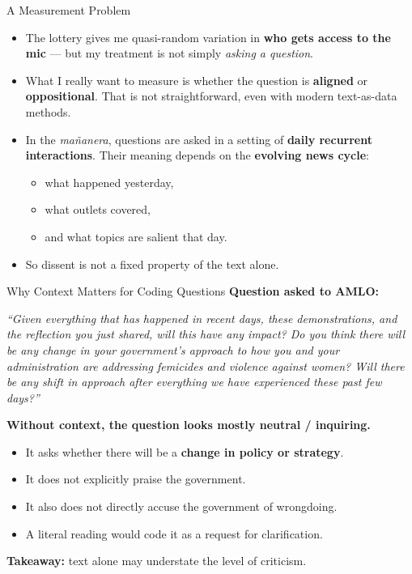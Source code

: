 \documentclass[10pt,aspectratio=169]{beamer}
\begin{document}
\begin{frame}{A Measurement Problem}
\small
\begin{itemize}\setlength\itemsep{0.6em}
    \item The lottery gives me quasi-random variation in \textbf{who gets access to the mic} --- but my treatment is not simply \textit{asking a question}.
    
    \item What I really want to measure is whether the question is \textbf{aligned} or \textbf{oppositional}. That is not straightforward, even with modern text-as-data methods.
    
    \item In the \textit{mañanera}, questions are asked in a setting of \textbf{daily recurrent interactions}. Their meaning depends on the \textbf{evolving news cycle}:
    \begin{itemize}\setlength\itemsep{0.2em}
        \item what happened yesterday,
        \item what outlets covered,
        \item and what topics are salient that day.
    \end{itemize}
    
    \item So \alert{dissent is not a fixed property of the text alone}.
\end{itemize}
\end{frame}

\begin{frame}{Why Context Matters for Coding Questions}
\small
\textbf{Question asked to AMLO:}

\vspace{0.3cm}

\emph{``Given everything that has happened in recent days, these demonstrations, and the reflection you just shared, will this have any impact? Do you think there will be any change in your government's approach to how you and your administration are addressing femicides and violence against women? Will there be any shift in approach after everything we have experienced these past few days?''}

\vspace{0.4cm}

\textbf{Without context, the question looks mostly \alert{neutral / inquiring}.}

\begin{itemize}
    \item It asks whether there will be a \textbf{change in policy or strategy}.
    \item It does not explicitly praise the government.
    \item It also does not directly accuse the government of wrongdoing.
    \item A literal reading would code it as a request for clarification.
\end{itemize}

\vspace{0.2cm}

\textbf{Takeaway:} text alone may understate the level of criticism.
\end{frame}
\end{document}
